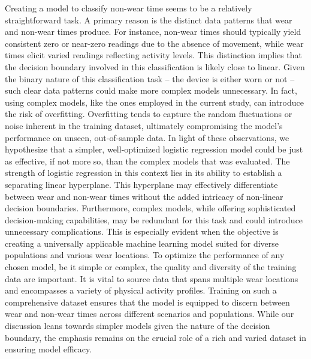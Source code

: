 \documentclass[
  10pt,
]{scrbook}
\begin{document}
Creating a model to classify non-wear time seems to be a relatively
straightforward task. A primary reason is the distinct data patterns
that wear and non-wear times produce. For instance, non-wear times
should typically yield consistent zero or near-zero readings due to the
absence of movement, while wear times elicit varied readings reflecting
activity levels. This distinction implies that the decision boundary
involved in this classification is likely close to linear. Given the
binary nature of this classification task -- the device is either worn
or not -- such clear data patterns could make more complex models
unnecessary. In fact, using complex models, like the ones employed in
the current study, can introduce the risk of overfitting. Overfitting
tends to capture the random fluctuations or noise inherent in the
training dataset, ultimately compromising the model's performance on
unseen, out-of-sample data. In light of these observations, we
hypothesize that a simpler, well-optimized logistic regression model
could be just as effective, if not more so, than the complex models that
was evaluated. The strength of logistic regression in this context lies
in its ability to establish a separating linear hyperplane. This
hyperplane may effectively differentiate between wear and non-wear times
without the added intricacy of non-linear decision boundaries.
Furthermore, complex models, while offering sophisticated
decision-making capabilities, may be redundant for this task and could
introduce unnecessary complications. This is especially evident when the
objective is creating a universally applicable machine learning model
suited for diverse populations and various wear locations. To optimize
the performance of any chosen model, be it simple or complex, the
quality and diversity of the training data are important. It is vital to
source data that spans multiple wear locations and encompasses a variety
of physical activity profiles. Training on such a comprehensive dataset
ensures that the model is equipped to discern between wear and non-wear
times across different scenarios and populations. While our discussion
leans towards simpler models given the nature of the decision boundary,
the emphasis remains on the crucial role of a rich and varied dataset in
ensuring model efficacy.
\end{document}
